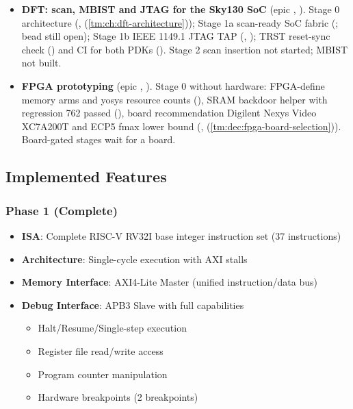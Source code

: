 \begin{record}

\begin{itemize}
\tightlist
\item
  \textbf{DFT: scan, MBIST and JTAG for the Sky130 SoC} (epic
  , ). Stage 0 architecture (,
   (\cref{tm:ch:dft-architecture})); Stage 1a scan-ready SoC fabric
  (; bead  still open); Stage 1b IEEE 1149.1 JTAG
  TAP (, ); TRST reset-sync check () and CI
   for both PDKs (). Stage 2 scan insertion
  not started; MBIST not built.
\item
  \textbf{FPGA prototyping} (epic , ). Stage 0
  without hardware: FPGA-define memory arms and yosys resource counts
  (), SRAM backdoor helper with  regression 762
  passed (), board recommendation Digilent Nexys Video XC7A200T
  and ECP5 fmax lower bound (,
   (\cref{tm:dec:fpga-board-selection})). Board-gated stages wait for a
  board.
\end{itemize}

\end{record}

\subsection{Implemented Features}\label{cr:status:phase-history:implemented-features}

\subsubsection{\texorpdfstring{Phase 1 (Complete)
\ok{}}{Phase 1 (Complete) }}\label{cr:status:phase-history:phase-1-complete-white-check-mark}

\begin{record}

\begin{itemize}
\tightlist
\item
  \textbf{ISA}: Complete RISC-V RV32I base integer instruction set (37
  instructions)
\item
  \textbf{Architecture}: Single-cycle execution with AXI stalls
\item
  \textbf{Memory Interface}: AXI4-Lite Master (unified
  instruction/\allowbreak{}data bus)
\item
  \textbf{Debug Interface}: APB3 Slave with full capabilities

  \begin{itemize}
  \tightlist
  \item
    Halt/\allowbreak{}Resume/\allowbreak{}Single-step execution
  \item
    Register file read/\allowbreak{}write access
  \item
    Program counter manipulation
  \item
    Hardware breakpoints (2 breakpoints)
  \end{itemize}
\end{itemize}

\end{record}


